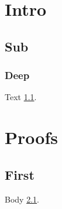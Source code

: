 \documentclass{IEEEtran}
\begin{document}
\section{Intro}
\subsection{Sub}\label{s}
\subsubsection{Deep}
Text \ref{s}.
\appendices
\section{Proofs}
\subsection{First}\label{a}
Body \ref{a}.
\end{document}
